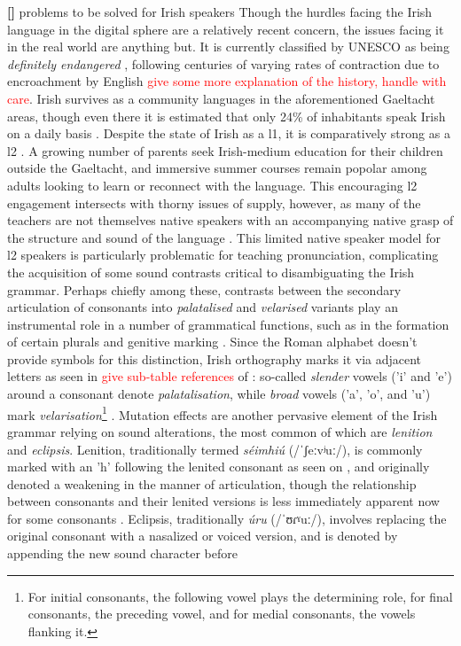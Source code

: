 \documentclass[thesis]{cluu}
\newcounter{paranum}
\newcommand{\numberedparagraph}{\par\refstepcounter{paranum}\textbf{[\theparanum] }}
\newcommand{\todo}[1]{\textcolor{red}{#1}}
\newcommand{\ipa}[1]{{\ipafont #1}}
\begin{document}
\numberedparagraph{problems to be solved for Irish speakers}
Though the hurdles facing the Irish language in the digital sphere are a relatively recent concern, the issues facing it in the real world are anything but. It is currently classified by UNESCO as being \textit{definitely endangered} \parencite{moseleyAtlasWorldsLanguages2010}, following centuries of varying rates of contraction due to encroachment by English \todo{give some more explanation of the history, handle with care}. Irish survives as a community languages in the aforementioned Gaeltacht areas, though even there it is estimated that only 24\% of inhabitants speak Irish on a daily basis \parencite{nichasaideSPEECHTECHNOLOGYDOCUMENTATION2015}. Despite the state of Irish as a \gls{l1}, it is comparatively strong as a \gls{l2} \parencite{broinNewUrbanIrish2014}. A growing number of parents seek Irish-medium education for their children outside the Gaeltacht, and immersive summer courses remain popolar among adults looking to learn or reconnect with the language. This encouraging \gls{l2} engagement intersects with thorny issues of supply, however, as many of the teachers are not themselves native speakers with an accompanying native grasp of the structure and sound of the language \parencite{nichasaideSPEECHTECHNOLOGYDOCUMENTATION2015,nichasaideCanWeDefuse2019}. This limited native speaker model for \gls{l2} speakers is particularly problematic for teaching pronunciation, complicating the acquisition of some sound contrasts critical to disambiguating the Irish grammar. Perhaps chiefly among these, contrasts between the secondary articulation of consonants into \textit{palatalised} and \textit{velarised} variants play an instrumental role in a number of grammatical functions, such as in the formation of certain plurals and genitive marking \parencite{snesarevaPalatalizationDublinIrish2016,gabrieleEnglishInfluenceL2,broinNewUrbanIrish2014,stensonModernIrishComprehensive2020}. Since the Roman alphabet doesn't provide symbols for this distinction, Irish orthography marks it via adjacent letters as seen in \todo{give sub-table references} of : so-called \textit{slender} vowels ('i' and 'e') around a consonant denote \textit{palatalisation}, while \textit{broad} vowels ('a', 'o', and 'u') mark \textit{velarisation}\footnote{For initial consonants, the following vowel plays the determining role, for final consonants, the preceding vowel, and for medial consonants, the vowels flanking it.} \parencite{stensonModernIrishComprehensive2020}. Mutation effects are another pervasive element of the Irish grammar relying on sound alterations, the most common of which are \textit{lenition} and \textit{eclipsis}. Lenition, traditionally termed \textit{séimhiú} (/\ipa{ˈʃeːvʲuː}/), is commonly marked with an 'h' following the lenited consonant as seen on , and originally denoted a weakening in the manner of articulation, though the relationship between consonants and their lenited versions is less immediately apparent now for some consonants \parencite{stensonModernIrishComprehensive2020}. Eclipsis, traditionally \textit{úru} (/\ipa{ˈʊɾˠuː}/), involves replacing the original consonant with a nasalized or voiced version, and is denoted by appending the new sound character before 
\end{document}

